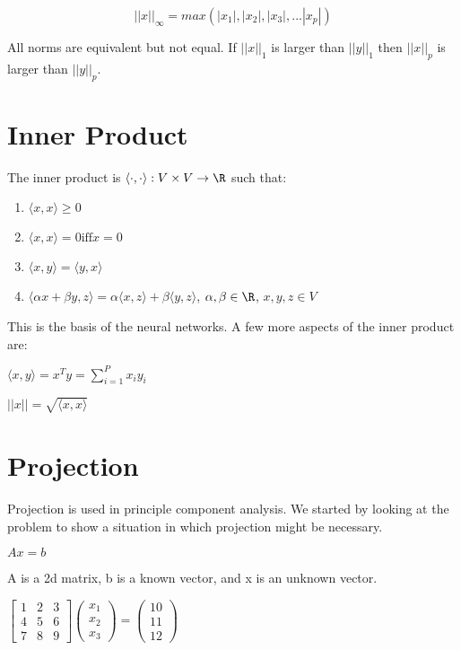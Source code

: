$$||x||_\infty = max(|x_1|, |x_2|, |x_3|, ... |x_p|)$$

All norms are equivalent but not equal. If $||x||_1$ is larger than $||y||_1$ then $||x||_p$ is larger than $||y||_p$.

\section{Inner Product}

The inner product is $\langle\cdot,\cdot\rangle: V \times V \rightarrow\R$ such that:

\begin{enumerate}
	\item $\langle x,x \rangle \geq 0$
	\item $\langle x,x \rangle = 0 \text{iff} x=0$
	\item $\langle x,y \rangle = \langle y,x \rangle$
	\item $\langle \alpha x+ \beta y,z \rangle = \alpha \langle x,z \rangle + \beta \langle y,z 			\rangle$,				$\alpha,\beta \in \R$,
			$x,y,z \in V$
\end{enumerate}

This is the basis of the neural networks. A few more aspects of the inner product are:

$\langle x,y \rangle = x^T y = \sum_{i=1}^{P}x_i y_i$

$||x|| = \sqrt{\langle x,x \rangle}$


\section{Projection}

Projection is used in principle component analysis. We started by looking at the problem to show a situation in which projection might be necessary.

$Ax=b$

A is a 2d matrix, b is a known vector, and x is an unknown vector.

$\begin{bmatrix}
1 & 2 & 3\\
4 & 5 & 6\\
7 & 8 & 9
\end{bmatrix}
\begin{pmatrix}
x_1\\
x_2\\
x_3
\end{pmatrix}
=
\begin{pmatrix}
10\\
11\\
12
\end{pmatrix}$


